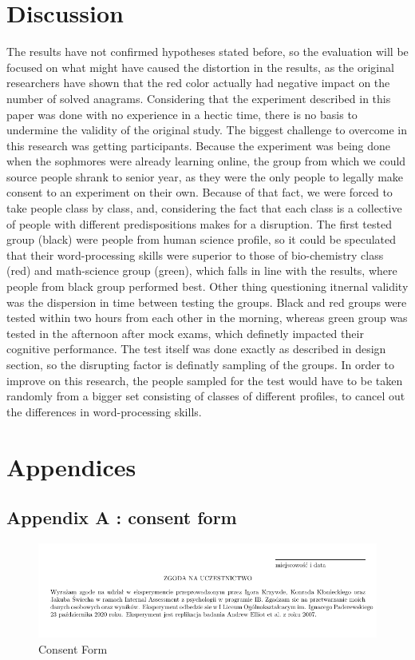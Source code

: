 \documentclass[12pt, a4]{article}
\begin{document}
\section*{Discussion}
The results have not confirmed hypotheses stated before, so the evaluation will be focused on what might have caused the distortion in the results, as the original researchers have shown that 
the red color actually had negative impact on the number of solved anagrams. Considering that the experiment described in this paper was done with no experience in a hectic time, there is no
basis to undermine the validity of the original study. The biggest challenge to overcome in this research was getting participants. Because the experiment was being done when the sophmores were already
learning online, the group from which we could source people shrank to senior year, as they were the only people to legally make consent to an experiment on their own. Because of that fact, we were forced
to take people class by class, and, considering the fact that each class is a collective of people with different predispositions makes for a disruption. The first tested group (black) were people from 
human science profile, so it could be speculated that their word-processing skills were superior to those of bio-chemistry class (red) and math-science group (green), which falls in line with the results, where
people from black group performed best. Other thing questioning itnernal validity was the dispersion in time between testing the groups. Black and red groups were tested within two hours from each other in the morning, 
whereas green group was tested in the afternoon after mock exams, which definetly impacted their cognitive performance. The test itself was done exactly as described in design section, so the disrupting factor is 
definatly sampling of the groups. In order to improve on this research, the people sampled for the test would have to be taken randomly from a bigger set consisting of classes of different profiles, to cancel out 
the differences in word-processing skills. 

\section*{Appendices}
\subsection*{Appendix A : consent form}
\begin{figure}[H]
\centering
    \caption{Consent Form}
    \includegraphics[width=\linewidth]{consent}
\end{figure}
\end{document}
